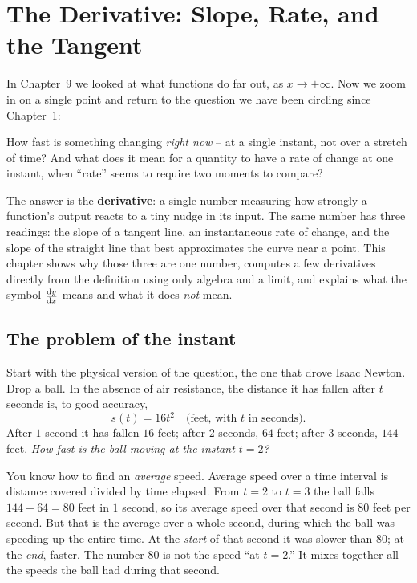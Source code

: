 \chapter{The Derivative: Slope, Rate, and the Tangent}

In Chapter~9 we looked at what functions do far out, as $x\to\pm\infty$. Now we zoom in on a single point and return to the question we have been circling since Chapter~1:

\begin{focusbox}
How fast is something changing \emph{right now} -- at a single instant, not over
a stretch of time? And what does it mean for a quantity to have a rate
of change at one instant, when ``rate'' seems to require two moments to compare?
\end{focusbox}

The answer is the \textbf{derivative}: a single number measuring how strongly a
function's output reacts to a tiny nudge in its input. The same number has three
readings: the slope of a tangent line, an instantaneous rate of change, and the
slope of the straight line that best approximates the curve near a point. This
chapter shows why those three are one number, computes a few derivatives
directly from the definition using only algebra and a limit, and explains what
the symbol $\frac{\mathrm{d} y}{\mathrm{d} x}$ means and what it does \emph{not} mean.

\chapterline

\section{The problem of the instant}
\label{ch10:problem-of-instant}

Start with the physical version of the question, the one that drove Isaac
Newton. Drop a ball. In the absence of air resistance, the distance it has fallen
after $t$ seconds is, to good accuracy,
\[
  s(t) = 16t^2 \quad \text{(feet, with $t$ in seconds).}
\]
After $1$ second it has fallen $16$ feet; after $2$ seconds, $64$ feet; after
$3$ seconds, $144$ feet. \emph{How fast is the ball moving at the
instant $t = 2$?}

You know how to find an \emph{average} speed. Average speed over a time interval
is distance covered divided by time elapsed. From $t = 2$ to $t = 3$ the ball
falls $144 - 64 = 80$ feet in $1$ second, so its average speed over that second
is $80$ feet per second. But that is the average over a whole second, during
which the ball was speeding up the entire time. At the \emph{start} of that second
it was slower than $80$; at the \emph{end}, faster. The number $80$ is not the
speed ``at $t = 2$.'' It mixes together all the speeds the ball had during
that second.

